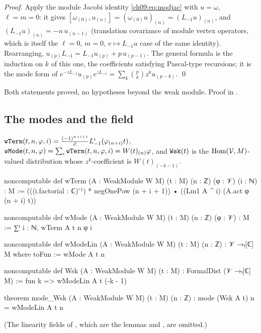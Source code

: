 \noindent\emph{Proof.} Apply the module Jacobi identity \eqref{ch09:eq:modjac} with $u=\omega$,
$\ell=m=0$: it gives $[\omega_{(0)},u_{(n)}]=(\omega_{(0)}u)_{(n)}=(L_{-1}u)_{(n)}$, and
$(L_{-1}u)_{(n)}=-n\,u_{(n-1)}$ (translation covariance of module vertex operators, which is itself the $\ell=0$, $m=0$, $v\mapsto L_{-1}u$ case of the
same identity). Rearranging, $u_{(p)}L_{-1}=L_{-1}u_{(p)}+p\,u_{(p-1)}$. The general formula is
the induction on $k$ of this one, the coefficients satisfying Pascal-type recursions; it is the
mode form of $e^{-zL_{-1}}u_{(p)}e^{zL_{-1}}=\sum_k\binom{p}{k}z^ku_{(p-k)}$. \qed

\begin{status}
Both statements proved, no hypotheses beyond the weak module. Proof in
.
\end{status}

\subsection{The modes and the field}

\begin{definition}\label{ch09:def:wMode}
$\lean{wTerm}(t,n,\varphi,i)=\frac{(-1)^{n+i+1}}{i!}L_{-1}^i(\varphi_{(n+i)}t)$,
$\lean{wMode}(t,n,\varphi)=\sum_i\lean{wTerm}(t,n,\varphi,i)=W(t)_{(n)}\varphi$, and
$\lean{Wsk}(t)$ is the $\operatorname{Hom}(\mathcal{V},M)$-valued distribution whose $z^k$-coefficient
is $W(t)_{(-k-1)}$.
\end{definition}
\begin{leancode}
noncomputable def wTerm (A : WeakModule W M) (t : M) (n : ℤ) (φ : 𝒱) (i : ℕ) : M :=
  (((i.factorial : ℂ)⁻¹) * negOnePow (n + i + 1)) • ((Lm1 A ^ i) (A.act φ (n + i) t))

noncomputable def wMode (A : WeakModule W M) (t : M) (n : ℤ) (φ : 𝒱) : M :=
  ∑ᶠ i : ℕ, wTerm A t n φ i

noncomputable def wModeLin (A : WeakModule W M) (t : M) (n : ℤ) : 𝒱 →ₗ[ℂ] M where
  toFun := wMode A t n

noncomputable def Wsk (A : WeakModule W M) (t : M) : FormalDist (𝒱 →ₗ[ℂ] M) :=
  fun k => wModeLin A t (-k - 1)

theorem mode_Wsk (A : WeakModule W M) (t : M) (n : ℤ) :
    mode (Wsk A t) n = wModeLin A t n
\end{leancode}
(The linearity fields of , which are the lemmas  and
, are omitted.)

